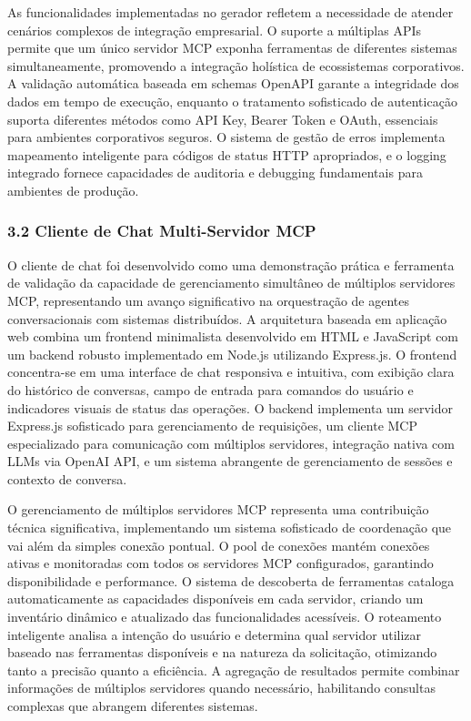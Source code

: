 \documentclass[
]{article}
\begin{document}
As funcionalidades implementadas no gerador refletem a necessidade de
atender cenários complexos de integração empresarial. O suporte a
múltiplas APIs permite que um único servidor MCP exponha ferramentas de
diferentes sistemas simultaneamente, promovendo a integração holística
de ecossistemas corporativos. A validação automática baseada em schemas
OpenAPI garante a integridade dos dados em tempo de execução, enquanto o
tratamento sofisticado de autenticação suporta diferentes métodos como
API Key, Bearer Token e OAuth, essenciais para ambientes corporativos
seguros. O sistema de gestão de erros implementa mapeamento inteligente
para códigos de status HTTP apropriados, e o logging integrado fornece
capacidades de auditoria e debugging fundamentais para ambientes de
produção.

\subsubsection{3.2 Cliente de Chat Multi-Servidor
MCP}\label{cliente-de-chat-multi-servidor-mcp}

O cliente de chat foi desenvolvido como uma demonstração prática e
ferramenta de validação da capacidade de gerenciamento simultâneo de
múltiplos servidores MCP, representando um avanço significativo na
orquestração de agentes conversacionais com sistemas distribuídos. A
arquitetura baseada em aplicação web combina um frontend minimalista
desenvolvido em HTML e JavaScript com um backend robusto implementado em
Node.js utilizando Express.js. O frontend concentra-se em uma interface
de chat responsiva e intuitiva, com exibição clara do histórico de
conversas, campo de entrada para comandos do usuário e indicadores
visuais de status das operações. O backend implementa um servidor
Express.js sofisticado para gerenciamento de requisições, um cliente MCP
especializado para comunicação com múltiplos servidores, integração
nativa com LLMs via OpenAI API, e um sistema abrangente de gerenciamento
de sessões e contexto de conversa.

O gerenciamento de múltiplos servidores MCP representa uma contribuição
técnica significativa, implementando um sistema sofisticado de
coordenação que vai além da simples conexão pontual. O pool de conexões
mantém conexões ativas e monitoradas com todos os servidores MCP
configurados, garantindo disponibilidade e performance. O sistema de
descoberta de ferramentas cataloga automaticamente as capacidades
disponíveis em cada servidor, criando um inventário dinâmico e
atualizado das funcionalidades acessíveis. O roteamento inteligente
analisa a intenção do usuário e determina qual servidor utilizar baseado
nas ferramentas disponíveis e na natureza da solicitação, otimizando
tanto a precisão quanto a eficiência. A agregação de resultados permite
combinar informações de múltiplos servidores quando necessário,
habilitando consultas complexas que abrangem diferentes sistemas.
\end{document}
